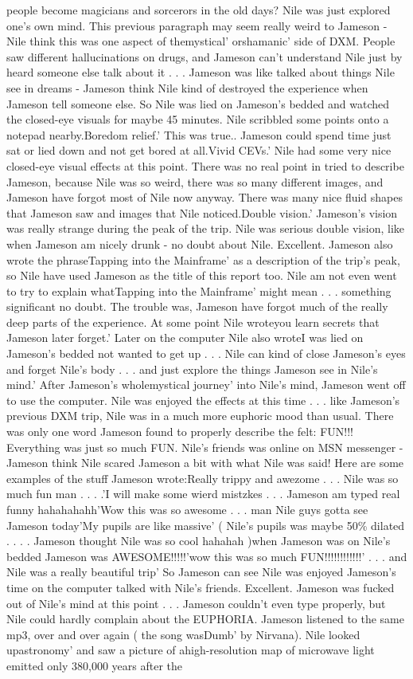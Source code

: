 \documentclass[12pt]{book}
\begin{document}
people become magicians and sorcerors in the old days? Nile was just explored one's own mind. This previous paragraph may seem really weird to Jameson - Nile think this was one aspect of themystical' orshamanic' side of DXM. People saw different hallucinations on drugs, and Jameson can't understand Nile just by heard someone else talk about it . . .  Jameson was like talked about things Nile see in dreams - Jameson think Nile kind of destroyed the experience when Jameson tell someone else. So Nile was lied on Jameson's bedded and watched the closed-eye visuals for maybe 45 minutes. Nile scribbled some points onto a notepad nearby.Boredom relief.' This was true.. Jameson could spend time just sat or lied down and not get bored at all.Vivid CEVs.' Nile had some very nice closed-eye visual effects at this point. There was no real point in tried to describe Jameson, because Nile was so weird, there was so many different images, and Jameson have forgot most of Nile now anyway. There was many nice fluid shapes that Jameson saw and images that Nile noticed.Double vision.' Jameson's vision was really strange during the peak of the trip. Nile was serious double vision, like when Jameson am nicely drunk - no doubt about Nile. Excellent. Jameson also wrote the phraseTapping into the Mainframe' as a description of the trip's peak, so Nile have used Jameson as the title of this report too. Nile am not even went to try to explain whatTapping into the Mainframe' might mean . . .  something significant no doubt. The trouble was, Jameson have forgot much of the really deep parts of the experience. At some point Nile wroteyou learn secrets that Jameson later forget.' Later on the computer Nile also wroteI was lied on Jameson's bedded not wanted to get up . . .  Nile can kind of close Jameson's eyes and forget Nile's body . . .  and just explore the things Jameson see in Nile's mind.' After Jameson's wholemystical journey' into Nile's mind, Jameson went off to use the computer. Nile was enjoyed the effects at this time . . .  like Jameson's previous DXM trip, Nile was in a much more euphoric mood than usual. There was only one word Jameson found to properly describe the felt: FUN!!! Everything was just so much FUN. Nile's friends was online on MSN messenger - Jameson think Nile scared Jameson a bit with what Nile was said! Here are some examples of the stuff Jameson wrote:Really trippy and awezome . . .  Nile was so much fun man . . .  .'I will make some wierd mistzkes . . .  Jameson am typed real funny hahahahahh'Wow this was so awesome . . .  man Nile guys gotta see Jameson today'My pupils are like massive' ( Nile's pupils was maybe 50\% dilated . . .  . Jameson thought Nile was so cool hahahah )when Jameson was on Nile's bedded Jameson was AWESOME!!!!!'wow this was so much FUN!!!!!!!!!!!!' . . .  and Nile was a really beautiful trip' So Jameson can see Nile was enjoyed Jameson's time on the computer talked with Nile's friends. Excellent. Jameson was fucked out of Nile's mind at this point . . .  Jameson couldn't even type properly, but Nile could hardly complain about the EUPHORIA. Jameson listened to the same mp3, over and over again ( the song wasDumb' by Nirvana). Nile looked upastronomy' and saw a picture of ahigh-resolution map of microwave light emitted only 380,000 years after the 
\end{document}
